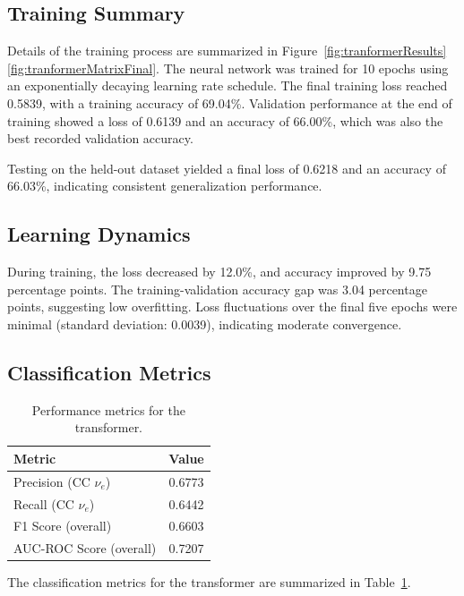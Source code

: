\documentclass{pracalicmgr}
\begin{document}
\subsection{Training Summary}

Details of the training process are summarized in Figure~\ref{fig:tranformerResults}\ref{fig:tranformerMatrixFinal}. The neural network was trained for 10 epochs using an exponentially decaying learning rate schedule. The final training loss reached 0.5839, with a training accuracy of 69.04\%. Validation performance at the end of training showed a loss of 0.6139 and an accuracy of 66.00\%, which was also the best recorded validation accuracy.

Testing on the held-out dataset yielded a final loss of 0.6218 and an accuracy of 66.03\%, indicating consistent generalization performance.

\subsection{Learning Dynamics}

During training, the loss decreased by 12.0\%, and accuracy improved by 9.75 percentage points. The training-validation accuracy gap was 3.04 percentage points, suggesting low overfitting. Loss fluctuations over the final five epochs were minimal (standard deviation: 0.0039), indicating moderate convergence.

\subsection{Classification Metrics}

\begin{table}[H]
    \centering
    \caption{Performance metrics for the transformer.}
    \begin{tabular}{lc}
        \toprule
        \textbf{Metric} & \textbf{Value} \\
        \midrule
        Precision (CC $\nu_e$) & 0.6773 \\
        Recall (CC $\nu_e$)    & 0.6442 \\
        F1 Score (overall) & 0.6603 \\
        AUC-ROC Score (overall) & 0.7207 \\
        \bottomrule
    \end{tabular}
    \label{tab:cc_metrics}
\end{table}

The classification metrics for the transformer are summarized in Table~\ref{tab:cc_metrics}.
\end{document}
